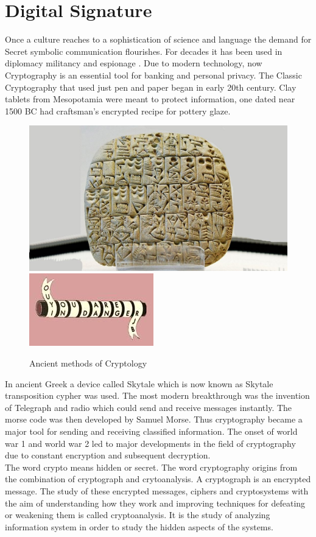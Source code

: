 \documentclass{article}
\begin{document}
\section{Digital Signature}
 Once a culture reaches to a sophistication of  science and language the demand for Secret symbolic communication  flourishes. For decades it has been used in diplomacy militancy and espionage . Due to modern technology, now Cryptography is an essential tool for banking and personal privacy. The Classic Cryptography that used just pen and paper began in early 20th century.  Clay tablets from Mesopotamia were meant to protect information, one dated near 1500 BC had craftsman's encrypted recipe for pottery glaze.\\

     \begin{figure}[!h]
    \centering
     \includegraphics[scale=0.12]{Ancient-clay-tablet-1024x576.jpg}
     \includegraphics[scale=0.76]{3c60b59d-9a9b-453d-9897-8cc601e3d67f_l.jpg}
\caption{Ancient methods of Cryptology}
  \end{figure}
  
   In ancient Greek a device called Skytale which is now known as Skytale transposition cypher was used.  The most modern breakthrough was the invention of Telegraph and radio which could send and receive messages  instantly. The morse code was then developed by Samuel Morse. Thus cryptography became a major tool for sending and receiving classified information. The onset of world war 1 and world war 2 led to major developments in the field of cryptography due to constant encryption and subsequent decryption. \\
The word crypto means hidden or secret. The word cryptography origins from the combination of cryptograph and crytoanalysis. A cryptograph is an encrypted message. The study of these encrypted messages, ciphers and cryptosystems with the aim of understanding how they work and improving techniques for defeating or weakening them is called cryptoanalysis. It is the study of analyzing information system in order to study the hidden aspects of the systems.
\end{document}
